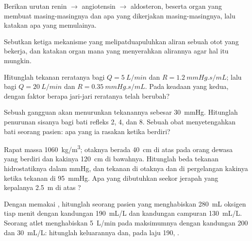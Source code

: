 \begin{exercise}[$\star$]\label{exo:b2:blood-pressure:3}
Berikan urutan renin $\to$ angiotensin $\to$ aldosteron, beserta organ
yang membuat masing-masingnya dan apa yang dikerjakan masing-masingnya,
lalu katakan apa yang memulainya.
\end{exercise}

\begin{exercise}[$\star$]\label{exo:b2:blood-pressure:4}
Sebutkan ketiga mekanisme yang melipatduapuluhkan aliran  sebuah
otot yang bekerja, dan katakan organ mana yang menyerahkan alirannya
agar hal itu mungkin.
\end{exercise}

\begin{exercise}[$\star\star$]\label{exo:b2:blood-pressure:5}
Hitunglah tekanan reratanya bagi $Q = \qty{5}{L/min}$ dan $R =
\qty{1.2}{mmHg.s/mL}$; lalu bagi $Q = \qty{20}{L/min}$ dan $R =
\qty{0.35}{mmHg.s/mL}$. Pada keadaan yang kedua, dengan faktor berapa
jari-jari  reratanya telah berubah?
\end{exercise}

\begin{exercise}[$\star\star$]\label{exo:b2:blood-pressure:6}
Sebuah gangguan akan menurunkan tekanannya sebesar \qty{30}{mmHg}.
Hitunglah penurunan sisanya bagi bati refleks 2, 4, dan 8. Sebuah obat
menyetengahkan bati  seorang pasien: apa yang ia rasakan
ketika berdiri?
\end{exercise}

\begin{exercise}[$\star\star$]\label{exo:b2:blood-pressure:7}
Rapat massa  \qty{1060}{kg/m^3}; otaknya berada \qty{40}{cm} di
atas  pada orang dewasa yang berdiri dan kakinya
\qty{120}{cm} di bawahnya. Hitunglah beda tekanan hidrostatiknya dalam
mmHg, dan tekanan  di otaknya dan di pergelangan kakinya ketika
tekanan di  \qty{95}{mmHg}. Apa yang dibutuhkan seekor
jerapah yang kepalanya \qty{2.5}{m} di atas ?
\end{exercise}

\begin{exercise}[$\star\star$]\label{exo:b2:blood-pressure:8}
Dengan memakai , hitunglah  seorang pasien yang
menghabiskan \qty{280}{mL} oksigen tiap menit dengan kandungan 
\qty{190}{mL/L} dan kandungan  campuran \qty{130}{mL/L}. Seorang
atlet menghabiskan \qty{5}{L/min} pada maksimumnya dengan kandungan 200
dan \qty{30}{mL/L}: hitunglah keluarannya dan, pada laju 190, .
\end{exercise}

